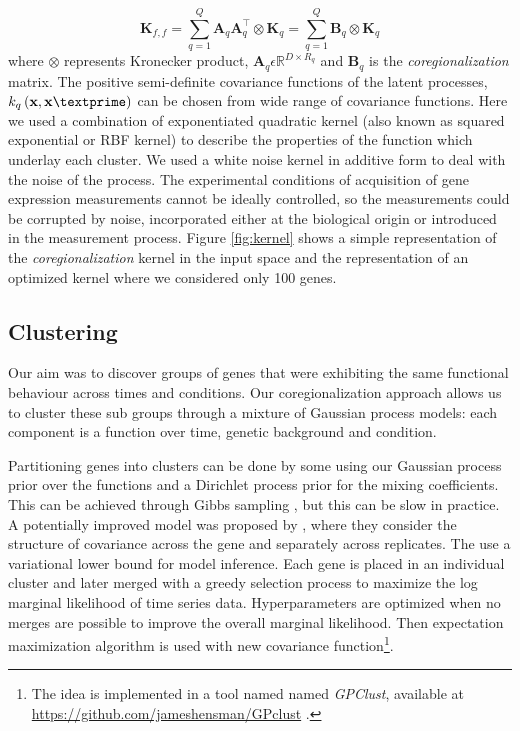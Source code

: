 \begin{equation} \label{eq:LMCcovK}
\textbf{K}_{f,f}=\sum\limits_{q=1}^Q \textbf{A}_q\textbf{A}^{\top}_q \otimes \textbf{K}_q
=\sum\limits_{q=1}^Q \textbf{B}_q \otimes \textbf{K}_q
\end{equation}
where $\otimes$ represents Kronecker product, $\textbf{A}_q \epsilon \mathbb{R}^{D\times R_q}$ and 
$\textbf{B}_q$ is the \emph{coregionalization} matrix. The positive semi-definite covariance functions
of the latent processes, $k_q\left(\textbf{x},\textbf{x}\textprime\right)$ can be chosen from wide
range of covariance functions. Here we used a combination of exponentiated quadratic kernel (also
known as squared exponential or RBF kernel) to describe the properties of the function which
underlay each cluster. We used a white noise kernel in additive form to deal with the noise of 
the process. The experimental conditions of acquisition of gene expression measurements cannot 
be ideally controlled, so the measurements could be corrupted by noise, incorporated either at 
the biological origin or introduced in the measurement process. Figure \ref{fig:kernel} shows
a simple representation of the \emph{coregionalization} kernel in the input space and the 
representation of an optimized kernel where we considered only 100 genes.

\subsection{Clustering}

Our aim was to discover groups of genes that were exhibiting the same functional behaviour across times and conditions. Our coregionalization approach allows us to cluster these sub groups through a mixture of Gaussian process models: each component is a function over time, genetic background and condition.

Partitioning genes into clusters can be done by some using our
Gaussian process prior over the functions and a Dirichlet process
prior for the mixing coefficients. This can be achieved through Gibbs
sampling \cite{Dunson:2010}, but this can be slow in practice. A
potentially improved model was proposed by \cite{Hensman:2013}, where
they consider the structure of covariance across the gene and
separately across replicates. The use a variational lower bound for
model inference. Each gene is placed in an individual cluster and
later merged with a greedy selection process to maximize the log
marginal likelihood of time series data. Hyperparameters are optimized
when no merges are possible to improve the overall marginal
likelihood. Then expectation maximization algorithm is used with new
covariance function\footnote{The idea is implemented in a tool named
  named \emph{GPClust}, available at
  \url{https://github.com/jameshensman/GPclust} \cite{Hensman:2013}. }.

